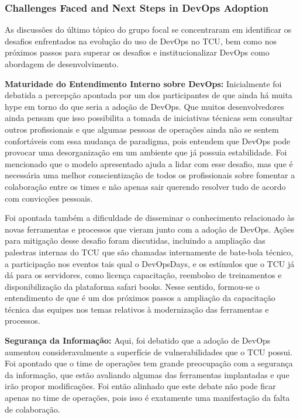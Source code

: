 \subsubsection{Challenges Faced and Next Steps in DevOps Adoption}
{
\color{red}


As discussões do último tópico do grupo focal se concentraram em identificar os desafios
enfrentados na evolução do uso de DevOps no TCU, bem como nos próximos passos para
superar os desafios e institucionalizar DevOps como abordagem de desenvolvimento.

\textbf{Maturidade do Entendimento Interno sobre DevOps:}
Inicialmente foi debatida a percepção apontada por um dos participantes de que ainda
há muita hype em torno do que seria a adoção de DevOps. Que muitos desenvolvedores
ainda pensam que isso possibilita a tomada de iniciativas técnicas sem consultar outros
profissionais e que algumas pessoas de operações ainda não se sentem confortáveis com essa
mudança de paradigma, pois entendem que DevOps pode provocar uma desorganização
em um ambiente que já possuia estabilidade. Foi mencionado que o modelo apresentado
ajuda a lidar com esse desafio, mas que é necessária uma melhor conscientização de todos
os profissionais sobre fomentar a colaboração entre os times e não apenas sair querendo
resolver tudo de acordo com convicções pessoais.

Foi apontada também a dificuldade de disseminar o conhecimento relacionado às novas
ferramentas e processos que vieram junto com a adoção de DevOps. Ações para mitigação
desse desafio foram discutidas, incluindo a ampliação das palestras internas do TCU que
são chamadas internamente de bate-bola técnico, a participação nos eventos tais qual o
DevOpsDays, e os estímulos que o TCU já dá para os servidores, como licença capacitação,
reembolso de treinamentos e disponibilização da plataforma safari books. Nesse sentido,
formou-se o entendimento de que é um dos próximos passos a ampliação da capacitação
técnica das equipes nos temas relativos à modernização das ferramentas e processos.

\textbf{Segurança da Informação:}
Aqui, foi debatido que a adoção de DevOps aumentou consideravalmente a superfície de
vulnerabilidades que o TCU possui. Foi apontado que o time de operações tem grande
preocupação com a segurança da informação, que estão avaliando algumas das ferramentas
implantadas e que irão propor modificações. Foi então alinhado que este debate não pode
ficar apenas no time de operações, pois isso é exatamente uma manifestação da falta de
colaboração.

}
